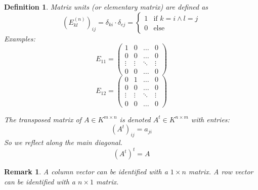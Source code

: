 \documentclass[a4paper,landscape,twocolumn]{article}
\newtheorem{defi}{Definition}[section]
\newtheorem{rem}{Remark}[section]
\begin{document}
\begin{defi}
  \emph{Matrix units} (or \emph{elementary matrix}) are defined as
  \[
    (E^{(n)}_{kl})_{ij} = \delta_{ki} \cdot \delta_{ej}
    = \begin{cases}
      1 & \text{if } k = i \land l = j \\
      0 & \text{else}
    \end{cases}
  \]
  Examples:
  \[
    E_{11} = \begin{pmatrix}
      1 & 0 & \ldots & 0 \\
      0 & 0 & \ldots & 0 \\
      \vdots & \vdots & \ddots & \vdots \\
      0 & 0 & \ldots & 0
    \end{pmatrix}
  \]
  \[
    E_{12} = \begin{pmatrix}
      0 & 1 & \ldots & 0 \\
      0 & 0 & \ldots & 0 \\
      \vdots & \vdots & \ddots & \vdots \\
      0 & 0 & \ldots & 0
    \end{pmatrix}
  \]

  The transposed matrix of $A \in K^{m\times n}$ is denoted
  $A^t \in K^{n\times m}$ with entries:
  \[ (A^t)_{ij} = a_{ji} \]
  So we reflect along the main diagonal.
  \[ (A^t)^t = A \]
\end{defi}
\begin{rem}
  A column vector can be identified with a $1 \times n$ matrix.
  A row vector can be identified with a $n \times 1$ matrix.
\end{rem}
\end{document}
